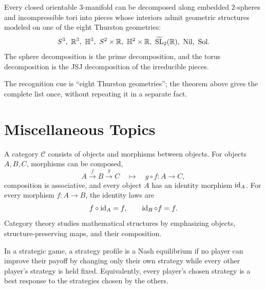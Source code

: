     \begin{theorem}
        Every closed orientable $3$-manifold can be decomposed along embedded
        $2$-spheres and incompressible tori into pieces whose interiors admit
        geometric structures modeled on one of the eight Thurston geometries:
        \[
            S^3,\ \R^3,\ \mathbb{H}^3,\ S^2\times\R,\ \mathbb{H}^2\times\R,
            \ \widetilde{\SL}_2(\R),\ \mathrm{Nil},\ \mathrm{Sol}.
        \]
        The sphere decomposition is the prime decomposition, and the torus
        decomposition is the JSJ decomposition of the irreducible pieces.
    \end{theorem}

    \begin{remark}
        The recognition cue is ``eight Thurston geometries''; the theorem above
        gives the complete list once, without repeating it in a separate fact.
    \end{remark}

    \chapter{Miscellaneous Topics}

    \relatedcourses{}

    \relatedbooks{}

    \begin{definition}[Category]
        A category $\mathcal{C}$ consists of objects and morphisms between
        objects. For objects $A,B,C$, morphisms can be composed,
        \[
            A\xrightarrow{f}B\xrightarrow{g}C
            \quad\longmapsto\quad
            g\circ f\colon A\to C,
        \]
        composition is associative, and every object $A$ has an identity
        morphism $\operatorname{id}_A$. For every morphism $f\colon A\to B$, the identity laws are
        \[
            f\circ\operatorname{id}_A=f,
            \qquad
            \operatorname{id}_B\circ f=f.
        \]
        Category theory studies mathematical structures by emphasizing objects,
        structure-preserving maps, and their composition.
    \end{definition}

    \begin{definition}
        In a strategic game, a strategy profile is a Nash equilibrium if no
        player can improve their payoff by changing only their own strategy
        while every other player's strategy is held fixed. Equivalently, every
        player's chosen strategy is a best response to the strategies chosen by
        the others.
    \end{definition}

